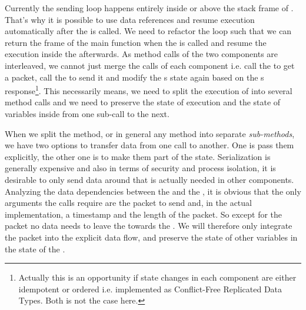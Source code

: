 Currently the sending loop happens entirely inside or above the stack frame of . That's why it is possible to use data references and resume execution automatically after the \dev{} is called. We need to refactor the loop such that we can return the frame of the main function when the \dev{} is called and resume the execution inside the \stack{} afterwards. As method calls of the two components are interleaved, we cannot just merge the calls of each component i.e. call the \stack{} to get a packet, call the \dev{} to send it and modify the \stack{}s state again based on the \dev{}s response\footnote{Actually this is an opportunity if state changes in each component are either idempotent or ordered i.e. implemented as Conflict-Free Replicated Data Types. Both is not the case here.}. This necessarily means, we need to split the execution of  into several method calls and we need to preserve the state of execution and the state of variables inside  from one sub-call to the next. 

When we split the  method, or in general any method into separate \emph{sub-methods}, we have two options to transfer data from one call to another. One is pass them explicitly, the other one is to make them part of the state. Serialization is generally expensive and also in terms of security and process isolation, it is desirable to only send data around that is actually needed in other components. Analyzing the data dependencies between the \stack{} and the \dev{}, it is obvious that the only arguments the \dev{} calls require are the packet to send and, in the actual implementation, a timestamp and the length of the packet. So except for the packet no data needs to leave the \stack{} towards the \dev{}. We will therefore only integrate the packet into the explicit data flow, and preserve the state of other variables in the state of the \stack{}.\\

